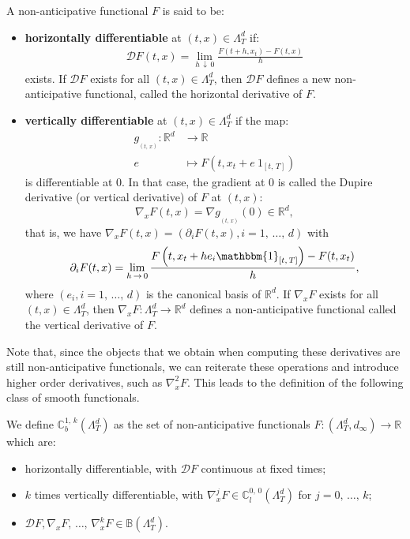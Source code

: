 \documentclass[AHL,Unicode,longabstracts,published]{cedram}
\newcommand{\bbC}{\mathbb{C}}
\newcommand{\bbB}{\mathbb{B}}
\newcommand{\bbmun}{\mathbbm{1}}
\newcommand{\calD}{\mathcal{D}}
\newcommand{\Rr}{{\mathbb{R}}}
\begin{document}
\begin{defi}
A non-anticipative functional $F$ is said to be:
\begin{itemize}
\item \textbf{horizontally differentiable} at $(t, {x}) \in \Lambda_T^d$ if:
\begin{align}
\calD F(t, {x}) = \lim_{h\,\downarrow\,0} \frac{F(t + h, {x}_t) - F(t, {x})}{h}
\end{align}
exists. If $\calD F$ exists for all $(t, {x}) \in \Lambda_T^d$, then $\calD F$ defines a new non-anticipative functional, called the horizontal derivative of $F$.
\item \textbf{vertically differentiable} at $(t, {x}) \in \Lambda_T^d$ if the map:
\begin{align*}
g_{_{(t,\,{x})}} : \Rr^d &\rightarrow \Rr\\
e &\mapsto F\left(t, {x}_t+e\ 1_{[t,\,T]}\right)
\end{align*}
is differentiable at $0$. In that case, the gradient at $0$ is called the Dupire derivative (or vertical derivative) of $F$ at $(t, {x})$:
\[
\nabla_{x} F(t, {x}) = \nabla g_{_{(t,\,{x})}}(0) \in \Rr^d,
\]
that is, we have $\nabla_{x} F(t, {x}) = (\partial_i F(t, {x}), i = 1,\,\dots,\,d)$ with
\[
\partial_i F(t, {x}) = \lim_{h\,\rightarrow\,0} \frac{F\left(t, {x}_t + he_i\bbmun_{[t,\,T]}\right) - F(t, {x}_t)}{h},
\]
where $(e_i, i=1,\,\dots,\,d)$ is the canonical basis of $\Rr^d$. If $\nabla_{x} F$ exists for all $(t, {x}) \in \Lambda_T^d$, then $\nabla_{x} F : \Lambda_T^d \rightarrow \Rr^d$ defines a non-anticipative functional called the vertical derivative of $F$.
\end{itemize}
\end{defi}

Note that, since the objects that we obtain when computing these derivatives are still non-anticipative functionals, we can reiterate these operations and introduce higher order derivatives, such as $\nabla_{x}^2 F$. This leads to the definition of the following class of smooth functionals.
\begin{defi}
We define $\bbC^{1,\,k}_b(\Lambda_T^d)$ as the set of non-anticipative functionals $F: (\Lambda_T^d, d_\infty) \rightarrow \Rr$ which are:
\begin{itemize}
\item horizontally differentiable, with $\calD F$ continuous at fixed times;
\item $k$ times vertically differentiable, with $\nabla_{x}^j F \in \bbC_l^{0,\,0}(\Lambda_T^d)$ for $j = 0,\,\ldots,\,k$;
\item $\calD F, \nabla_{x} F,\,\ldots,\,\nabla_{x}^k F \in \bbB(\Lambda_T^d)$.
\end{itemize}
\end{defi}
\end{document}
